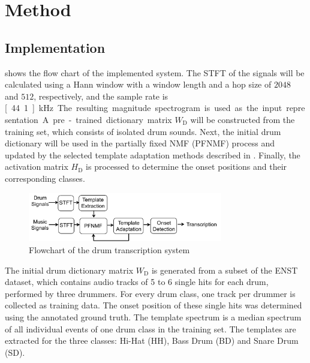 \documentclass{article}
\begin{document}
\section{Method}\label{sec:method}
\subsection{Implementation}\label{subsec:processing steps}

 shows the flow chart of the implemented system. The STFT of the signals will be calculated using a Hann window with a window length and a hop size of $2048$ and $512$, respectively, and the sample rate is \unit[44.1]{kHz}. The resulting magnitude spectrogram is used as the input representation. 
A pre-trained dictionary matrix $W_\mathrm{D}$ will be constructed from the training set, which consists of isolated drum sounds. 
Next, the initial drum dictionary will be used in the partially fixed NMF (PFNMF) process\cite{Wu2015} and updated by the selected template adaptation methods described in . Finally, the activation matrix $H_\mathrm{D}$ is processed to determine the onset positions and their corresponding classes. 

\begin{figure}
 \centerline{%
 \includegraphics[width=8.5cm]{flow.pdf}}%
 \caption{Flowchart of the drum transcription system}
 \label{fig:flowchart}
\end{figure}

The initial drum dictionary matrix $W_\mathrm{D}$ is generated from a subset of the ENST dataset, which contains audio tracks of 5 to 6 single hits for each drum, performed by three drummers. For every drum class, one track per drummer is collected as training data. The onset position of these single hits was determined using the annotated ground truth. The template spectrum is a median spectrum of all individual events of one drum class in the training set. The templates are extracted for the three classes: Hi-Hat (HH), Bass Drum (BD) and Snare Drum (SD).   
\end{document}
